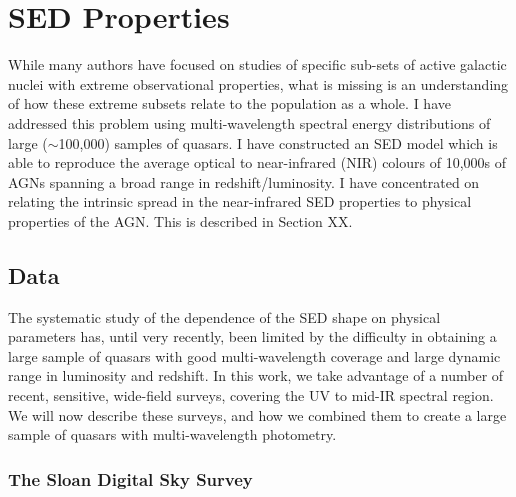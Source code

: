 \chapter{SED Properties}\label{ch:hotdust} 



\the\textwidth
While many authors have focused on studies of specific sub-sets of active galactic nuclei with extreme observational properties, what is missing is an understanding of how these extreme subsets relate to the population as a whole. 
I have addressed this problem using multi-wavelength spectral energy distributions of large ($\sim$100,000) samples of quasars. 
I have constructed an SED model which is able to reproduce the average optical to near-infrared (NIR) colours of 10,000s of AGNs spanning a broad range in redshift/luminosity. 
I have concentrated on relating the intrinsic spread in the near-infrared SED properties to physical properties of the AGN.
This is described in Section XX.  

\section{Data}

The systematic study of the dependence of the SED shape on physical parameters has, until very recently, been limited by the difficulty in obtaining a large sample of quasars with good multi-wavelength coverage and large dynamic range in luminosity and redshift. 
In this work, we take advantage of a number of recent, sensitive, wide-field surveys, covering the UV to mid-IR spectral region. 
We will now describe these surveys, and how we combined them to create a large sample of quasars with multi-wavelength photometry.        

\subsection{The Sloan Digital Sky Survey}

